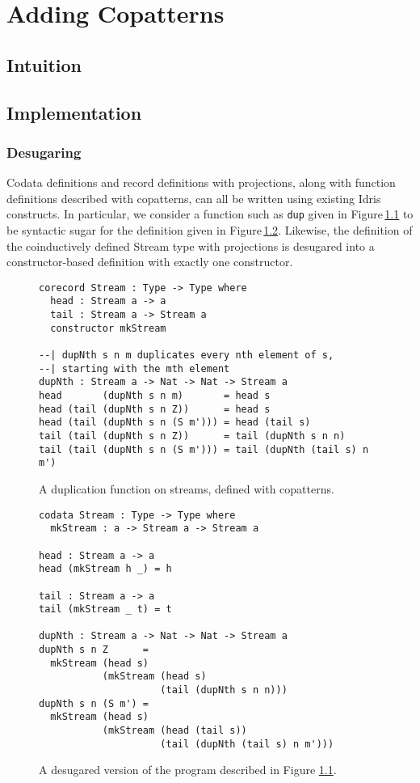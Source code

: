 \chapter{Adding Copatterns}

\section{Intuition}

\section{Implementation}
\subsection{Desugaring}
Codata definitions and record definitions with projections, along with function definitions described with copatterns, can all be written using existing Idris constructs. In particular, we consider a function such as \texttt{dup} given in Figure\,\ref{fig:dup_copatterns} to be syntactic sugar for the definition given in Figure\,\ref{fig:dup_desugared}. Likewise, the definition of the coinductively defined Stream type with projections is desugared into a constructor-based definition with exactly one constructor.

\begin{figure}
\begin{lstlisting}
corecord Stream : Type -> Type where
  head : Stream a -> a
  tail : Stream a -> Stream a
  constructor mkStream

--| dupNth s n m duplicates every nth element of s, 
--| starting with the mth element
dupNth : Stream a -> Nat -> Nat -> Stream a
head       (dupNth s n m)       = head s
head (tail (dupNth s n Z))      = head s
head (tail (dupNth s n (S m'))) = head (tail s)
tail (tail (dupNth s n Z))      = tail (dupNth s n n)
tail (tail (dupNth s n (S m'))) = tail (dupNth (tail s) n m')
\end{lstlisting}
\caption{A duplication function on streams, defined with copatterns.}
\label{fig:dup_copatterns}
\end{figure}

\begin{figure}
\begin{lstlisting}
codata Stream : Type -> Type where
  mkStream : a -> Stream a -> Stream a

head : Stream a -> a
head (mkStream h _) = h

tail : Stream a -> a
tail (mkStream _ t) = t

dupNth : Stream a -> Nat -> Nat -> Stream a
dupNth s n Z      =
  mkStream (head s)
           (mkStream (head s)
                     (tail (dupNth s n n)))
dupNth s n (S m') =
  mkStream (head s)
           (mkStream (head (tail s))
                     (tail (dupNth (tail s) n m')))
\end{lstlisting}
\caption{A desugared version of the program described in Figure \ref{fig:dup_copatterns}.}
\label{fig:dup_desugared}
\end{figure}

